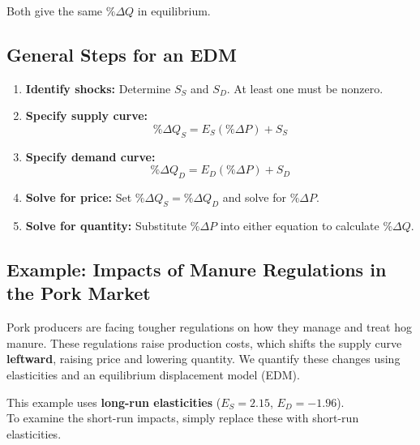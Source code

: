\documentclass[
  letterpaper,
  DIV=11,
  numbers=noendperiod]{scrartcl}
\providecommand{\tightlist}{%
  \setlength{\itemsep}{0pt}\setlength{\parskip}{0pt}}
\begin{document}
Both give the same \(\% \Delta Q\) in equilibrium.

\subsection{General Steps for an EDM}\label{general-steps-for-an-edm}

\begin{enumerate}
\def\labelenumi{\arabic{enumi}.}
\tightlist
\item
  \textbf{Identify shocks:} Determine \(S_S\) and \(S_D\). At least one
  must be nonzero.\\
\item
  \textbf{Specify supply curve:}\\
  \[
  \% \Delta Q_S = E_S (\% \Delta P) + S_S
  \]
\item
  \textbf{Specify demand curve:}\\
  \[
  \% \Delta Q_D = E_D (\% \Delta P) + S_D
  \]
\item
  \textbf{Solve for price:} Set \(\% \Delta Q_S = \% \Delta Q_D\) and
  solve for \(\% \Delta P\).\\
\item
  \textbf{Solve for quantity:} Substitute \(\% \Delta P\) into either
  equation to calculate \(\% \Delta Q\).
\end{enumerate}

\newpage

\subsection{Example: Impacts of Manure Regulations in the Pork
Market}\label{example-impacts-of-manure-regulations-in-the-pork-market}

Pork producers are facing tougher regulations on how they manage and
treat hog manure. These regulations raise production costs, which shifts
the supply curve \textbf{leftward}, raising price and lowering quantity.
We quantify these changes using elasticities and an equilibrium
displacement model (EDM).

\begin{tcolorbox}[enhanced jigsaw, bottomtitle=1mm, colbacktitle=quarto-callout-note-color!10!white, opacitybacktitle=0.6, colback=white, colframe=quarto-callout-note-color-frame, rightrule=.15mm, leftrule=.75mm, left=2mm, breakable, title=\textcolor{quarto-callout-note-color}{\faInfo}\hspace{0.5em}{Note}, toptitle=1mm, titlerule=0mm, arc=.35mm, bottomrule=.15mm, toprule=.15mm, opacityback=0, coltitle=black]

This example uses \textbf{long-run elasticities} (\(E_S = 2.15\),
\(E_D = -1.96\)).\\
To examine the short-run impacts, simply replace these with short-run
elasticities.

\end{tcolorbox}
\end{document}
